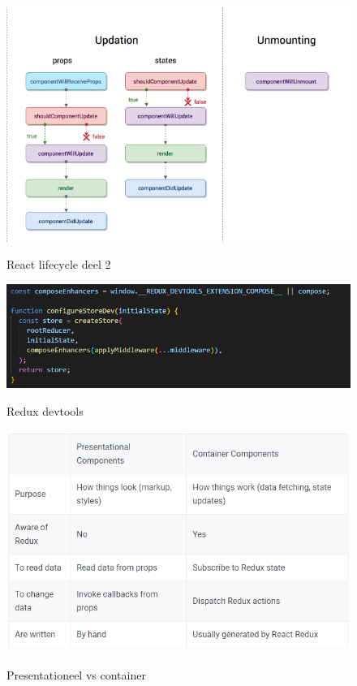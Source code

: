 \documentclass[fleqn,a4paper,12pt]{book}
\begin{document}
\begin{figure}
	\begin{center}
		\caption{React lifecycle deel 2}
		\includegraphics[width=15cm]{img/react-lifecycle2}\\[0.5cm]
	\end{center}
\end{figure}
\begin{figure}
	\begin{center}
		\caption{Redux devtools}
		\includegraphics[width=14cm]{img/redux-devtools}\\[0.5cm]
	\end{center}
\end{figure}
\begin{figure}
	\begin{center}
		\caption{Presentationeel vs container}
		\includegraphics[width=13cm]{img/presentational-vs-container}\\[0.5cm]
	\end{center}
\end{figure}
\end{document}
